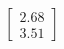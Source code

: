 \documentclass[preview]{standalone}
\begin{document}
\begin{align*}
\begin{bmatrix} 2.68 \\ 3.51 \end{bmatrix}
\end{align*}
\end{document}
